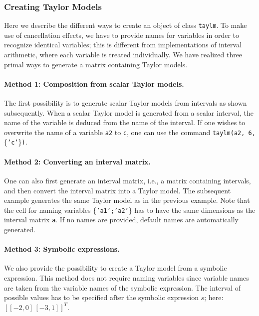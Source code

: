 \subsubsection{Creating Taylor Models} \label{sec:createTaylorModels}

Here we describe the different ways to create an object of class \texttt{taylm}. To make use of cancellation effects, we have to provide names for variables in order to recognize identical variables; this is different from implementations of interval arithmetic, where each variable is treated individually. We have realized three primal ways to generate a matrix containing Taylor models.

\paragraph{Method 1: Composition from scalar Taylor models.} The first possibility is to generate scalar Taylor models from intervals as shown subsequently.
    {\small
}
When a scalar Taylor model is generated from a scalar interval, the name of the variable is deduced from the name of the interval. If one wishes to overwrite the name of a variable \texttt{a2} to \texttt{c}, one can use the command \texttt{taylm(a2, 6, }\{\texttt{'c'}\}\texttt{)}.

\paragraph{Method 2: Converting an interval matrix.} One can also first generate an interval matrix, i.e., a matrix containing intervals, and then convert the interval matrix into a Taylor model. The subsequent example generates the same Taylor model as in the previous example.
    {\small
}
Note that the cell for naming variables \{\texttt{'a1';'a2'}\} has to have the same dimensions as the interval matrix \texttt{a}. If no names are provided, default names are automatically generated.

\paragraph{Method 3: Symbolic expressions.} We also provide the possibility to create a Taylor model from a symbolic expression.
    {\small
}
This method does not require naming variables since variable names are taken from the variable names of the symbolic expression. The interval of possible values has to be specified after the symbolic expression $s$; here: $[[-2,0]\, [-3, 1]]^T$.

